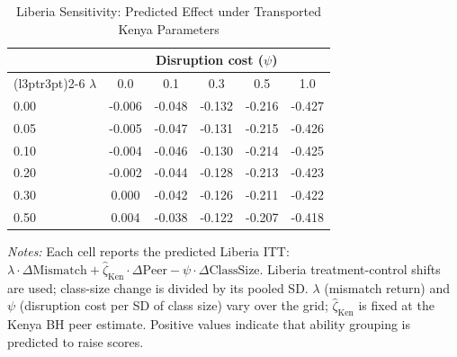 \begin{table}[H]
\centering
\caption{Liberia Sensitivity: Predicted Effect under Transported Kenya Parameters}
\label{tab:lib_sensitivity}
\begin{threeparttable}
\begin{tabular}[t]{l*{5}{c}}
\toprule
 & \multicolumn{5}{c}{Disruption cost ($\psi$)} \\
\cmidrule(l{3pt}r{3pt}){2-6}
$\lambda$ & 0.0 & 0.1 & 0.3 & 0.5 & 1.0 \\
\midrule
0.00 &  -0.006 &  -0.048 &  -0.132 &  -0.216 &  -0.427 \\
0.05 &  -0.005 &  -0.047 &  -0.131 &  -0.215 &  -0.426 \\
0.10 &  -0.004 &  -0.046 &  -0.130 &  -0.214 &  -0.425 \\
0.20 &  -0.002 &  -0.044 &  -0.128 &  -0.213 &  -0.423 \\
0.30 &   0.000 &  -0.042 &  -0.126 &  -0.211 &  -0.422 \\
0.50 &   0.004 &  -0.038 &  -0.122 &  -0.207 &  -0.418 \\
\bottomrule
\end{tabular}
\begin{tablenotes}
\footnotesize
\item \textit{Notes:} Each cell reports the predicted Liberia ITT: $\lambda \cdot \Delta\text{Mismatch} + \hat{\zeta}_{\text{Ken}} \cdot \Delta\text{Peer} - \psi \cdot \Delta\text{ClassSize}$. Liberia treatment-control shifts are used; class-size change is divided by its pooled SD. $\lambda$ (mismatch return) and $\psi$ (disruption cost per SD of class size) vary over the grid; $\hat{\zeta}_{\text{Ken}}$ is fixed at the Kenya BH peer estimate. Positive values indicate that ability grouping is predicted to raise scores.
\end{tablenotes}
\end{threeparttable}
\end{table}
